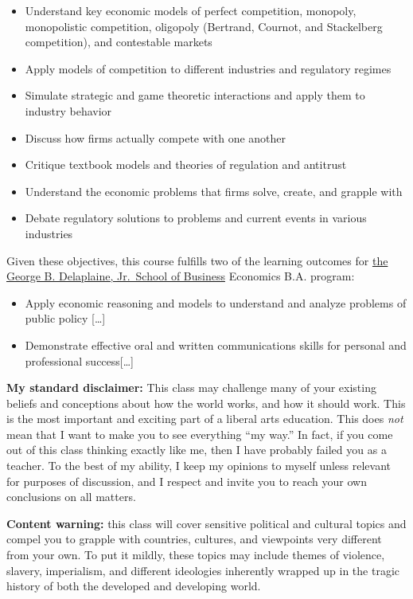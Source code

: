 \documentclass{article}
\providecommand{\tightlist}{%
  \setlength{\itemsep}{0pt}\setlength{\parskip}{0pt}}
\begin{document}
\begin{itemize}
\tightlist
\item
  Understand key economic models of perfect competition, monopoly,
  monopolistic competition, oligopoly (Bertrand, Cournot, and
  Stackelberg competition), and contestable markets
\item
  Apply models of competition to different industries and regulatory
  regimes
\item
  Simulate strategic and game theoretic interactions and apply them to
  industry behavior
\item
  Discuss how firms actually compete with one another
\item
  Critique textbook models and theories of regulation and antitrust
\item
  Understand the economic problems that firms solve, create, and grapple
  with
\item
  Debate regulatory solutions to problems and current events in various
  industries
\end{itemize}

Given these objectives, this course fulfills two of the learning
outcomes for
\href{https://www.hood.edu/academics/departments/george-b-delaplaine-jr-school-business/student-learning-outcomes}{the
George B. Delaplaine, Jr.~School of Business} Economics B.A. program:

\begin{itemize}
\tightlist
\item
  Apply economic reasoning and models to understand and analyze problems
  of public policy {[}\ldots{]}
\item
  Demonstrate effective oral and written communications skills for
  personal and professional success{[}\ldots{]}
\end{itemize}

\textbf{My standard disclaimer:} This class may challenge many of your
existing beliefs and conceptions about how the world works, and how it
should work. This is the most important and exciting part of a liberal
arts education. This does \emph{not} mean that I want to make you to see
everything ``my way.'' In fact, if you come out of this class thinking
exactly like me, then I have probably failed you as a teacher. To the
best of my ability, I keep my opinions to myself unless relevant for
purposes of discussion, and I respect and invite you to reach your own
conclusions on all matters.

\textbf{Content warning:} this class will cover sensitive political and
cultural topics and compel you to grapple with countries, cultures, and
viewpoints very different from your own. To put it mildly, these topics
may include themes of violence, slavery, imperialism, and different
ideologies inherently wrapped up in the tragic history of both the
developed and developing world.
\end{document}

